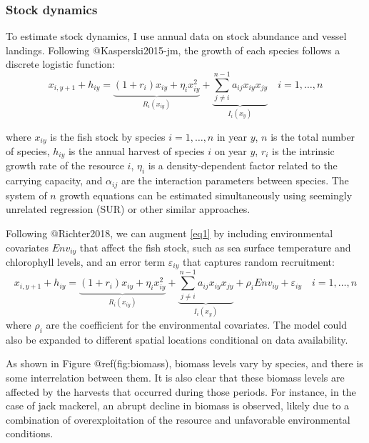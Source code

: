 \hypertarget{stock-dynamics}{%
\subsubsection{Stock dynamics}\label{stock-dynamics}}

To estimate stock dynamics, I use annual data on stock abundance and
vessel landings. Following @Kasperski2015-jm, the growth of each species
follows a discrete logistic function: \begin{equation}
x_{i,y+1} + h_{iy} = \underbrace{(1 + r_i)x_{iy} + \eta_i x_{iy}^2}_{R_i(x_{iy})} + \underbrace{\sum_{j \neq i}^{n-1} a_{ij} x_{iy} x_{jy}}_{I_i(x_y)} \quad i=1,\ldots,n
\label{eq1}
\end{equation}

where \(x_{iy}\) is the fish stock by species \(i=1,\ldots,n\) in year
\(y\), \(n\) is the total number of species, \(h_{iy}\) is the annual
harvest of species \(i\) on year \(y\), \(r_i\) is the intrinsic growth
rate of the resource \(i\), \(\eta_i\) is a density-dependent factor
related to the carrying capacity, and \(\alpha_{ij}\) are the
interaction parameters between species. The system of \(n\) growth
equations can be estimated simultaneously using seemingly unrelated
regression (SUR) or other similar approaches.

Following @Richter2018, we can augment \eqref{eq1} by including
environmental covariates \(Env_{iy}\) that affect the fish stock, such
as sea surface temperature and chlorophyll levels, and an error term
\(\varepsilon_{iy}\) that captures random recruitment: \begin{equation}
x_{i,y+1} + h_{iy} = \underbrace{(1 + r_i)x_{iy} + \eta_i x_{iy}^2}_{R_i(x_{iy})} + \underbrace{\sum_{j \neq i}^{n-1} a_{ij} x_{iy} x_{jy}}_{I_i(x_y)} + \rho_i Env_{iy} + \varepsilon_{iy} \quad i=1,\ldots,n
\label{eq2}
\end{equation} where \(\rho_i\) are the coefficient for the
environmental covariates. The model could also be expanded to different
spatial locations conditional on data availability.

As shown in Figure @ref(fig:biomass), biomass levels vary by species,
and there is some interrelation between them. It is also clear that
these biomass levels are affected by the harvests that occurred during
those periods. For instance, in the case of jack mackerel, an abrupt
decline in biomass is observed, likely due to a combination of
overexploitation of the resource and unfavorable environmental
conditions.

